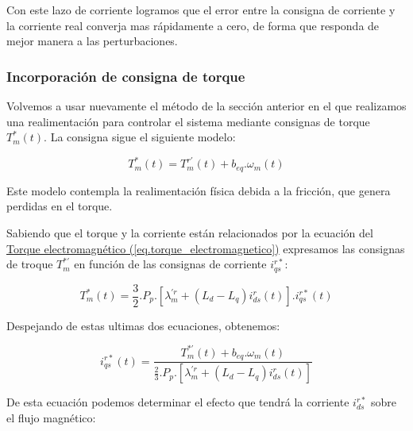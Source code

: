 \documentclass{article}
\begin{document}
Con este lazo de corriente logramos que el error entre la consigna de corriente y la corriente real
converja mas rápidamente a cero, de forma que responda de mejor manera a las perturbaciones.




\subsubsection{Incorporación de consigna de torque}

Volvemos a usar nuevamente el método de la sección anterior en el que realizamos una realimentación
para controlar el sistema mediante consignas de torque $T_m^*(t)$. La consigna sigue el siguiente modelo:

\begin{equation}
    T_m^*(t) = T_m^{r\prime}(t) + b_{eq}.\omega_m(t)
\end{equation}

Este modelo contempla la realimentación física debida a la fricción, que genera perdidas en el torque.

Sabiendo que el torque y la corriente están relacionados por la ecuación del
\hyperref[eq.torque_electromagnetico]{Torque electromagnético (\ref*{eq.torque_electromagnetico})}
expresamos las consignas de troque $T_m^{*\prime}$ en función de las consignas de corriente $i_{qs}^{r*}$:

\begin{equation}
    T_m^{*}(t) = \frac{3}{2}.P_p.[\lambda_m^{\prime r} + (L_d - L_q)i_{ds}^{r}(t)].i_{qs}^{r*}(t)
\end{equation}

Despejando de estas ultimas dos ecuaciones, obtenemos:

\begin{equation}
    i_{qs}^{r*}(t) = \frac{T_m^{*\prime}(t) + b_{eq}.\omega_m(t)}{\frac{2}{3}.P_p.[\lambda_m^{\prime r} + (L_d - L_q)i_{ds}^{r}(t)]}
\end{equation}



De esta ecuación podemos determinar el efecto que tendrá la corriente $i_{ds}^{r*}$ sobre el flujo magnético:
\end{document}
